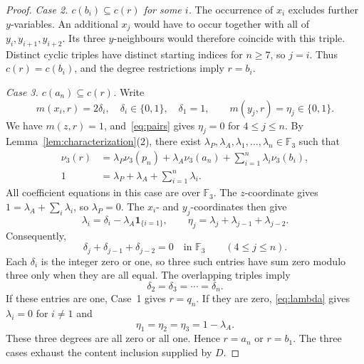 \documentclass[10pt,a4paper]{amsart}
\newcommand{\F}{\mathbb F}
\numberwithin{equation}{section}
\begin{document}
\begin{proof}
\emph{Case 2. $c(b_i)\subseteq c(r)$ for some $i$.} The occurrence of
$x_i$ excludes further $y$-variables. An additional $x_j$ would have to
occur together with all of $y_i,y_{i+1},y_{i+2}$. Its three $y$-neighbours
would therefore coincide with this triple. Distinct cyclic triples have
distinct starting indices for $n\geq7$, so $j=i$. Thus $c(r)=c(b_i)$,
and the degree restrictions imply $r=b_i$.

\emph{Case 3. $c(a_n)\subseteq c(r)$.} Write
\[
m(x_i,r)=2\delta_i,\quad \delta_i\in\{0,1\},\quad\delta_1=1,
\qquad m(y_j,r)=\eta_j\in\{0,1\}.
\]
We have $m(z,r)=1$, and~\eqref{eq:pairs} gives $\eta_j=0$ for
$4\leq j\leq n$. By Lemma~\ref{lem:characterization}(2), there exist
$\lambda_P,\lambda_A,\lambda_1,\ldots,\lambda_n\in\F_3$ such that
\begin{align*}
\nu_3(r)&=\lambda_P\nu_3(p_n)+\lambda_A\nu_3(a_n)
              +\sum_{i=1}^n\lambda_i\nu_3(b_i),\\
1&=\lambda_P+\lambda_A+\sum_{i=1}^n\lambda_i.
\end{align*}
All coefficient equations in this case are over $\F_3$. The
$z$-coordinate gives $1=\lambda_A+\sum_i\lambda_i$, so
$\lambda_P=0$. The $x_i$- and $y_j$-coordinates then give
\begin{equation}\label{eq:lambda}
\lambda_i=\delta_i-\lambda_A\mathbf1_{\{i=1\}},\qquad
\eta_j=\lambda_j+\lambda_{j-1}+\lambda_{j-2}.
\end{equation}
Consequently,
\[
\delta_j+\delta_{j-1}+\delta_{j-2}=0\quad\text{in }\F_3
\qquad(4\leq j\leq n).
\]
Each $\delta_i$ is the integer zero or one, so three such entries have
sum zero modulo three only when they are all equal. The overlapping
triples imply
\[
\delta_2=\delta_3=\cdots=\delta_n.
\]
If these entries are one, Case~1 gives $r=q_n$. If they are zero,
\eqref{eq:lambda} gives $\lambda_i=0$ for $i\ne1$ and
\[
\eta_1=\eta_2=\eta_3=1-\lambda_A.
\]
These three degrees are all zero or all one. Hence $r=a_n$ or $r=b_1$.
The three cases exhaust the content inclusion supplied by $D$.
\end{proof}
\end{document}
